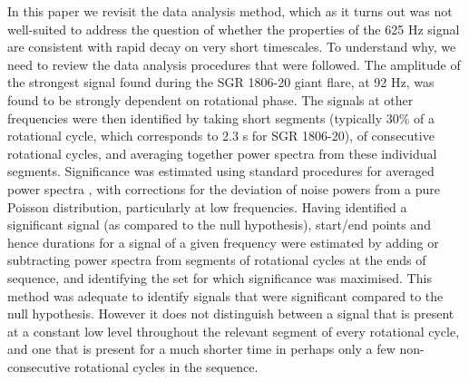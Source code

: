 \documentclass{emulateapj}
\begin{document}
In this paper we revisit the data analysis method, which as it turns out was not well-suited to address the question of whether the properties of the 625 Hz signal are consistent with rapid decay on very short timescales.
To understand why, we need to review the data analysis procedures that were followed. The amplitude of the strongest signal found during the SGR 1806-20 giant flare, at 92 Hz, was found to be strongly dependent on rotational phase. The signals at other frequencies were then identified by taking short segments (typically $30\%$ of a rotational cycle, which corresponds to 2.3 s for SGR 1806-20), of consecutive rotational cycles, and averaging together power spectra from these individual segments. Significance was estimated using standard procedures for averaged power spectra \citep{vanderKlis89}, with corrections for the deviation of noise powers from a pure Poisson distribution, particularly at low frequencies. Having identified a significant signal (as compared to the null hypothesis), start/end points and hence durations for a signal of a given frequency were estimated by adding or subtracting power spectra from segments of rotational cycles at the ends of sequence, and identifying the set for which significance was maximised. This method was adequate to identify signals that were significant compared to the null hypothesis. However it does not distinguish between a signal that is present at a constant low level throughout the relevant segment of every rotational cycle, and one that is present for a much shorter time in perhaps only a few non-consecutive rotational cycles in the sequence.
\end{document}
